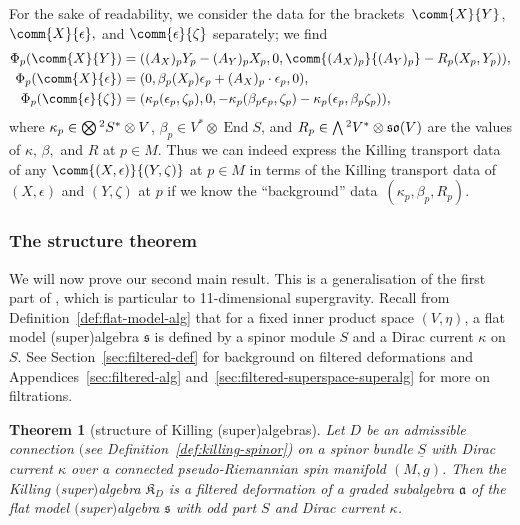 \documentclass[10pt,a4paper]{amsart}
\numberwithin{equation}{section}
\newtheorem{Theorem}{Theorem}[section]
\newcommand{\fa}{\mathfrak{a}}
\newcommand{\fs}{\mathfrak{s}}
\newcommand{\fso}{\mathfrak{so}}
\newcommand{\fK}{\mathfrak{K}}
\newcommand{\Sbundle}{\underline{S}}
\newcommand{\Wedge}{\mathchoice{{\textstyle\bigwedge}}{\bigwedge}{\bigwedge}{\bigwedge}}	%
\newcommand{\Otimes}{\mathchoice{{\textstyle\bigotimes}}{\bigotimes}{\bigotimes}{\bigotimes}}
\newcommand{\1}{\mathbbm{1}}
\DeclareMathOperator{\End}{End}
\begin{document}
For the sake of readability, we consider the data for the brackets~$\comm{X}{Y}$, $\comm{X}{\epsilon},$ and $\comm{\epsilon}{\zeta}$ separately; we find
\begin{align}
	\Phi_p(\comm{X}{Y})
		&= ((A_X)_p Y_p - (A_Y)_p X_p,0,\comm{(A_X)_p}{(A_Y)_p} - R_p(X_p,Y_p)),
		\label{eq:phi-p-XY}\\
	\Phi_p(\comm{X}{\epsilon})
		&= (0,\beta_p(X_p)\epsilon_p + (A_X)_p\cdot\epsilon_p,0),
		\label{eq:phi-p-Xepsilon}\\
	\Phi_p(\comm{\epsilon}{\zeta})
		&= (\kappa_p(\epsilon_p,\zeta_p),0,- \kappa_p(\beta_p\epsilon_p,\zeta_p) - \kappa_p(\epsilon_p,\beta_p\zeta_p)),
		\label{eq:phi-p-epsilonzeta}
\end{align}
where $\kappa_p\in\Otimes^2S^*\otimes V$, $\beta_p\in V^*\otimes\End S$, and $R_p\in\Wedge^2V^*\otimes \fso(V)$ are the values of $\kappa$, $\beta,$ and $R$ at $p\in M$. Thus we can indeed express the Killing transport data of any $\comm{(X,\epsilon)}{(Y,\zeta)}$ at $p\in M$ in terms of the Killing transport data of $(X,\epsilon)$ and $(Y,\zeta)$ at $p$ if we know the ``background'' data~$(\kappa_p,\beta_p,R_p)$.

\subsubsection{The structure theorem}

We will now prove our second main result. This is a generalisation of the first part of \cite[Theorem~12]{Figueroa-OFarrill2017_1}, which is particular to 11-dimensional supergravity. Recall from Definition~\ref{def:flat-model-alg} that for a fixed inner product space $(V,\eta)$, a flat model (super)algebra $\fs$ is defined by a spinor module $S$ and a Dirac current $\kappa$ on $S$. See Section~\ref{sec:filtered-def} for background on filtered deformations and Appendices~\ref{sec:filtered-alg} and~\ref{sec:filtered-superspace-superalg} for more on filtrations.

\begin{Theorem}[structure of Killing (super)algebras]\label{thm:killing-algebra-filtered}
	Let $D$ be an admissible connection $($see Definition~{\rm\ref{def:killing-spinor})} on a spinor bundle $\Sbundle$ with Dirac current $\kappa$ over a connected pseudo-Riemannian spin manifold $(M,g)$. Then the Killing $($super$)$algebra $\fK_D$ is a filtered deformation of a graded subalgebra $\fa$ of the flat model $($super$)$algebra $\fs$ with odd part $S$ and Dirac current $\kappa$.
\end{Theorem}
\end{document}

